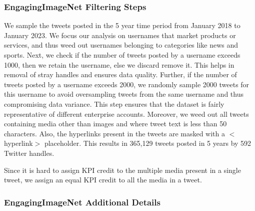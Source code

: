 \subsubsection{EngagingImageNet Filtering Steps}
\label{sec:dataset_processing}
 We sample the tweets posted in the 5 year time period from January 2018 to January 2023.
 We focus our analysis on usernames that market products or services, and thus weed out usernames belonging to categories like news and sports. Next, we check if the number of tweets posted by a username exceeds 1000, then we retain the username, else we discard remove it. This helps in removal of stray handles and ensures data quality. Further, if the number of tweets posted by a username exceeds 2000, we randomly sample 2000 tweets for this username to avoid oversampling tweets from the same username and thus compromising data variance. This step ensures that the dataset is fairly representative of different enterprise accounts. Moreover, we weed out all tweets containing media other than images and where tweet text is less than 50 characters. Also, the hyperlinks present in the tweets are masked with a $<$hyperlink$>$ placeholder. This results in 365,129 tweets posted in 5 years by 592 Twitter handles.

Since it is hard to assign KPI credit to the multiple media present in a single tweet, we assign an equal KPI credit to all the media in a tweet.




\subsubsection{EngagingImageNet Additional Details}
\label{sec:EngagingImageNet Additional Details}






\begin{table}[!htp]\centering
\caption{Distribution of ground truth EngagingImageNet images }\label{tab:twitter_data_scores-ground-truth}
\scriptsize
{}
\end{table}


